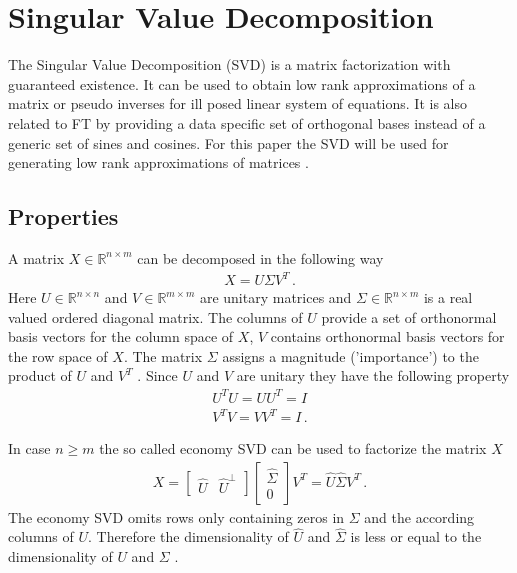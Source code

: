 \section{Singular Value Decomposition}
The Singular Value Decomposition (SVD) is a matrix factorization with guaranteed existence.
It can be used to obtain low rank approximations of a matrix or pseudo inverses for ill posed linear system of equations.
It is also related to FT by providing a data specific set of orthogonal bases instead of a generic set of sines and cosines. For this paper the SVD will be used for generating low rank approximations of matrices \cite{brunton_kutz_2019b}.
\subsection{Properties}
A matrix \(X \in \mathbb{R}^{n \times m}\) can be decomposed in the following way
\begin{gather}
X = U \Sigma V^{T} \,.
\end{gather}
Here \(U \in\mathbb{R}^{n \times n}\) and \(V \in\mathbb{R}^{m \times m}\) are unitary matrices and \(\Sigma \in \mathbb{R}^{n \times m}\) is a real valued ordered diagonal matrix.
The columns of \(U\) provide a set of orthonormal basis vectors for the column space of \(X\), \(V\) contains orthonormal basis vectors for the row space of \(X\). The matrix \(\Sigma\) assigns a magnitude ('importance') to the product of \(U\) and \(V^{T}\)  \cite{brunton_kutz_2019a}.
Since \(U\) and \(V\) are unitary they have the following property \cite{SZABO2015385}
\begin{gather}
U^{T}U = UU^{T} = I \\
V^{T}V = VV^{T} = I \,.
\end{gather}

In case \(n \geq m\) the so called economy SVD can be used to factorize the matrix \(X\)
\begin{gather}
X = \begin{bmatrix}
\hat{U} & \hat{U}^{\bot}
\end{bmatrix} 
\begin{bmatrix}
\hat{\Sigma} \\
0
\end{bmatrix}
V^{T} = \hat{U} \hat{\Sigma} V^{T} \,.
\end{gather} 
The economy SVD omits rows only containing zeros in \(\Sigma\) and the according columns of \(U\).
Therefore the dimensionality of \(\hat{U}\) and \(\hat{\Sigma}\) is less or equal to the dimensionality of \(U\) and \(\Sigma\) 
 \cite{brunton_kutz_2019b}.

